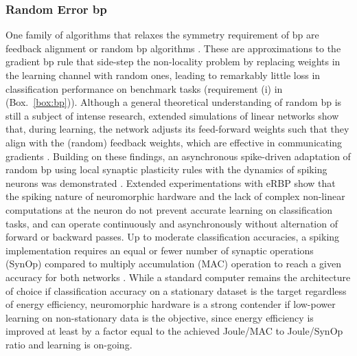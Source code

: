 \documentclass[journal,onecolumn,11pt]{IEEEtran}
\newcommand{\reffig}[1]{{\color{blue!70}(Fig.~\ref{#1})}}
\newcommand{\refbox}[1]{{\color{blue!70}(Box.~\ref{#1})}}
\begin{document}
\subsubsection{Random Error \Gls{bp}}
One family of algorithms that relaxes the symmetry requirement of \Gls{bp} are feedback alignment or random \Gls{bp} algorithms \cite{Lillicrap_etal16_randsyna,Baldi_etal16_learmach}. 
These are approximations to the gradient \Gls{bp} rule that side-step the non-locality problem by replacing weights in the learning channel with random ones, leading to remarkably little loss in classification performance on benchmark tasks (requirement (i) in \refbox{box:bp}). 
Although a general theoretical understanding of random \Gls{bp} is still a subject of intense research, extended simulations of linear networks show that, during learning, the network adjusts its feed-forward weights such that they align with the (random) feedback weights, which are effective in communicating gradients \cite{Lillicrap_etal16_randsyna}.
Building on these findings, an asynchronous spike-driven adaptation of random \Gls{bp} using local synaptic plasticity rules with the dynamics of spiking neurons was demonstrated \cite{Neftci_etal17_evenrand}.
Extended experimentations with \Gls{eRBP} show that the spiking nature of neuromorphic hardware and the lack of complex non-linear computations at the neuron do not prevent accurate learning on classification tasks, and can operate continuously and asynchronously without alternation of forward or backward passes.
Up to moderate classification accuracies, a spiking implementation requires an equal or fewer number of synaptic operations (SynOp) compared to multiply accumulation (MAC) operation to reach a given accuracy for both networks \cite{Neftci_etal17_evenrand}.
While a standard computer remains the architecture of choice if classification accuracy on a stationary dataset is the target regardless of energy efficiency, neuromorphic hardware is a strong contender if low-power learning on non-stationary data is the objective, since energy efficiency is improved at least by a factor equal to the achieved Joule/MAC to Joule/SynOp ratio and learning is on-going.
\end{document}
